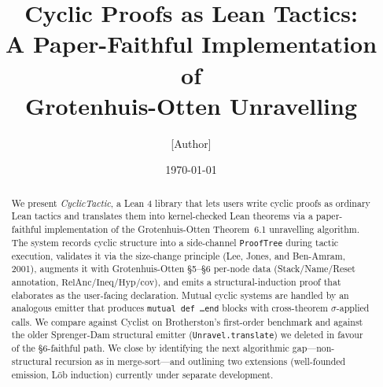 \documentclass[11pt,a4paper]{article}
\title{Cyclic Proofs as Lean Tactics:\\
  A Paper-Faithful Implementation of\\
  Grotenhuis-Otten Unravelling}
\author{[Author]}
\date{\today}
\begin{document}
\maketitle

\begin{abstract}
We present \emph{CyclicTactic}, a Lean 4 library that lets users write cyclic
proofs as ordinary Lean tactics and translates them into kernel-checked Lean
theorems via a paper-faithful implementation of the Grotenhuis-Otten
Theorem~6.1 unravelling algorithm. The system records cyclic structure into a
side-channel \texttt{ProofTree} during tactic execution, validates it via the
size-change principle (Lee, Jones, and Ben-Amram, 2001), augments it with
Grotenhuis-Otten §5--§6 per-node data (Stack/Name/Reset annotation,
\(\mathrm{RelAnc}\)/\(\mathrm{Ineq}\)/\(\mathrm{Hyp}\)/\(\mathrm{cov}\)), and
emits a structural-induction proof that elaborates as the user-facing
declaration. Mutual cyclic systems are handled by an analogous emitter that
produces \texttt{mutual def \dots end} blocks with cross-theorem
\(\sigma\)-applied calls. We compare against Cyclist on Brotherston's
first-order benchmark and against the older Sprenger-Dam structural
emitter (\texttt{Unravel.translate}) we deleted in favour of the §6-faithful
path. We close by identifying the next algorithmic gap---non-structural
recursion as in merge-sort---and outlining two extensions (well-founded
emission, Löb induction) currently under separate development.
\end{abstract}

\tableofcontents










\end{document}
